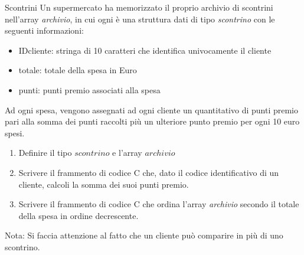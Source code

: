 \documentclass[format=169]{beamer}
\begin{document}
\begin{frame}[allowframebreaks]{Scontrini}
Un supermercato ha memorizzato il proprio archivio di scontrini nell'array \emph{archivio}, in cui ogni è una struttura dati di tipo \emph{scontrino} con le  seguenti informazioni:
\begin{itemize}
\item IDcliente: stringa di 10 caratteri che identifica univocamente il cliente
\item totale: totale della spesa in Euro
\item punti: punti premio associati alla spesa
\end{itemize}
Ad ogni spesa, vengono assegnati ad ogni cliente un quantitativo di punti premio pari alla somma dei punti raccolti più un ulteriore punto premio per ogni 10 euro spesi.

\begin{enumerate}
\item  Definire il tipo $scontrino$ e l'array $archivio$
\item Scrivere il frammento di codice C che, dato il codice identificativo di un cliente, calcoli la somma dei suoi punti premio.
\item Scrivere il frammento di codice C che ordina l'array \emph{archivio} secondo il totale della spesa in ordine decrescente.
\end{enumerate}
Nota: Si faccia attenzione al fatto che un cliente può comparire in più di uno scontrino.
\end{frame}
\end{document}
